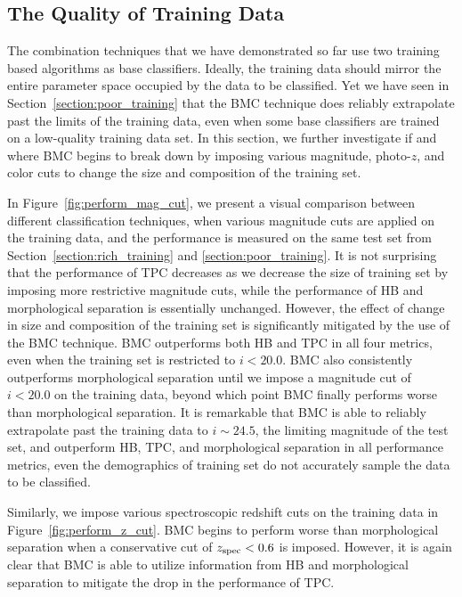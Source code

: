 \documentclass[useAMS,usenatbib]{mn2e}
\begin{document}
\subsection{The Quality of Training Data}
  \label{section:quality_training}

The combination techniques that we have demonstrated so far use
two training based algorithms as base classifiers.
Ideally, the training data should mirror the entire parameter space
occupied by the data to be classified.
Yet we have seen in Section~\ref{section:poor_training}
that the BMC technique does reliably
extrapolate past the limits of the training data,
even when some base classifiers are trained on a low-quality training data set.
In this section, we further investigate
if and where BMC begins to break down
by imposing various magnitude, photo-$z$, and color cuts
to change the size and composition of the training set.

In Figure~\ref{fig:perform_mag_cut}, we present
a visual comparison between different classification techniques,
when various magnitude cuts are applied on the training data,
and the performance is measured on the same test set
from Section~\ref{section:rich_training} and \ref{section:poor_training}.
It is not surprising that the performance of TPC decreases
as we decrease the size of training set
by imposing more restrictive magnitude cuts,
while the performance of HB and morphological separation
is essentially unchanged.
However, the effect of change in size and composition of the training set
is significantly mitigated by the use of the BMC technique.
BMC outperforms both HB and TPC in all four metrics,
even when the training set is restricted to $i < 20.0$.
BMC also consistently outperforms morphological separation
until we impose a magnitude cut of $i < 20.0$ on the training data,
beyond which point BMC finally performs worse than morphological separation.
It is remarkable that BMC is able to reliably extrapolate
past the training data to $i \sim 24.5$,
the limiting magnitude of the test set, and outperform HB, TPC,
and morphological separation in all performance metrics,
even the demographics of training set do not accurately sample 
the data to be classified.

Similarly, we impose various spectroscopic redshift cuts 
on the training data in Figure~\ref{fig:perform_z_cut}. 
BMC begins to perform worse than morphological separation
when a conservative cut of $z_{{\mathrm{spec}}} < 0.6$ is imposed.
However, it is again clear that BMC is able to
utilize information from HB and morphological separation to
mitigate the drop in the performance of TPC.
\end{document}

